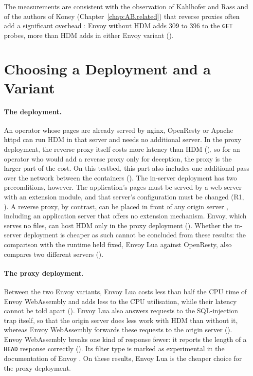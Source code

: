 \documentclass{rptuma}
\begin{document}
The measurements are consistent with the observation of Kahlhofer and Rass and of the authors of
Koney (Chapter~\ref{chap:AB.related}) that reverse proxies often add a significant overhead
\cite{kahlhofer2024application,kahlhofer2025koney}:
Envoy without HDM adds 309 to 396\us{} to the \texttt{GET} probes, more than HDM adds in either
Envoy variant ().

\section{Choosing a Deployment and a Variant}
\label{sec:disc.choice}

\paragraph{The deployment.} An operator whose pages are already served by nginx, OpenResty or Apache
httpd can run HDM in that server and needs no additional server. In the proxy deployment, the
reverse proxy itself costs more latency than HDM (), so for an
operator who would add a reverse proxy only for deception, the proxy is the larger part of the
cost. On this testbed, this part also includes one additional pass over the network between the
containers (). The in-server deployment has two preconditions, however.
The application's pages must be served by a web server with an extension module, and that server's
configuration must be changed (R1, ). A reverse proxy, by contrast, can
be placed in front of any origin server \cite{rfc9110}, including an application server that offers
no extension mechanism. Envoy, which serves no files, can host HDM only in the proxy deployment
(). Whether the in-server deployment is cheaper as such cannot be
concluded from these results: the comparison with the runtime held fixed, Envoy Lua against
OpenResty, also compares two different servers ().

\paragraph{The proxy deployment.} Between the two Envoy variants, Envoy Lua costs less than half
the CPU time of Envoy WebAssembly and adds less to the CPU utilisation, while their latency cannot be
told apart
(). Envoy Lua also answers requests to the SQL-injection trap
itself, so that the origin server does less work with HDM than without it, whereas Envoy
WebAssembly forwards these requests to the origin server (). Envoy
WebAssembly breaks one kind of response fewer: it reports the length of a \texttt{HEAD} response
correctly (). Its filter type is marked as experimental in the
documentation of Envoy \cite{envoy_wasm_filter}. On these results, Envoy Lua is the cheaper choice
for the proxy deployment.
\end{document}
